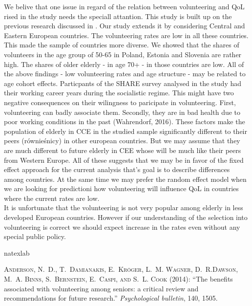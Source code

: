 \documentclass[10pt, letterpaper]{article}
\begin{document}
\begin{spacing}{1.4}
We belive that one issue in regard of the relation between volunteering and QoL rised in the study needs the speciall attantion. This study is built up on the previous research discussed in \citet{haski09}. Our study extends it by considering Central and Eastern European countries. The volunteering rates are low in all these countries. This made the sample of countries more diverse. We showed that the shares of volunteers in the age group of 50-65 in Poland, Estonia and Slovenia are rather high. The shares of older elderly - in age 70+ - in those countries are low. All of the above findings - low volunteering rates and age structure - may be related to age cohort effects. Particpants of the SHARE survey analysed in the study had their working career years during the socialistic regime. This might have two negative consequences on their wilingness to paricipate in volunteering. First, volunteering can badly associate them. Secondly, they are in bad health due to poor working conditions in the past (Wahrendorf, 2016). These factors make the population of elderly in CCE in the studied sample significantly different to their peers (równieśnicy) in other european countries. But we may assume that they are much different to future elderly in CEE whose will be much like their peers from Western Europe. All of these suggests that we may be in favor of the fixed effect approach for the current analysis that's goal is to describe differences among countries. At the same time we may prefer  the random effect model when we are looking for predictioni how volunteering will influence QoL in countries where the current rates are low. \\

It is unfortunate that the volunteering is not very popular among elderly in less developed European countries. However if our understanding of the selection into volunteering is correct we should expect increase in the rates even without any special public policy.  




\begin{thebibliography}{87}
\newcommand{\enquote}[1]{``#1''}
\expandafter\ifx\csname natexlab\endcsname\relax\def\natexlab#1{#1}\fi

\textsc{Anderson, N.~D., T.~Damianakis, E.~Kr{\"o}ger, L.~M. Wagner, D.~R.Dawson, M.~A. Binns, S.~Bernstein, E.~Caspi, and S.~L. Cook} (2014):  \enquote{The benefits associated with volunteering among seniors: a critical  review and recommendations for future research.} \emph{Psychological bulletin}, 140, 1505.


\end{thebibliography}
\end{spacing}
\end{document}
